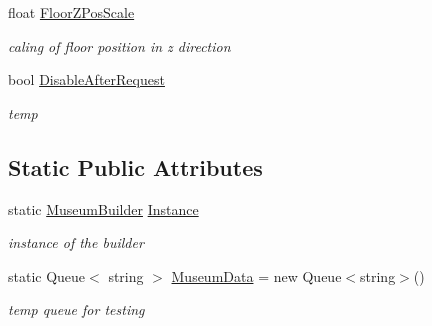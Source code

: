 \begin{DoxyCompactItemize}
float \mbox{\hyperlink{class_museum_builder_a221fec90b7a551d41df9a6593b649c51}{Floor\+Z\+Pos\+Scale}}
\begin{DoxyCompactList}\small\item\em caling of floor position in z direction \end{DoxyCompactList}\item 
bool \mbox{\hyperlink{class_museum_builder_a13b0442ec3a7b4aededb9a7d90572c70}{Disable\+After\+Request}}
\begin{DoxyCompactList}\small\item\em temp \end{DoxyCompactList}\end{DoxyCompactItemize}
\subsection*{Static Public Attributes}
\begin{DoxyCompactItemize}
\item 
static \mbox{\hyperlink{class_museum_builder}{Museum\+Builder}} \mbox{\hyperlink{class_museum_builder_a072af37ad11eefd26fbac2f98e9414bf}{Instance}}
\begin{DoxyCompactList}\small\item\em instance of the builder \end{DoxyCompactList}\item 
static Queue$<$ string $>$ \mbox{\hyperlink{class_museum_builder_ab659e7b1adaace5d5c8dec90df493483}{Museum\+Data}} = new Queue$<$string$>$()
\begin{DoxyCompactList}\small\item\em temp queue for testing \end{DoxyCompactList}\end{DoxyCompactItemize}
